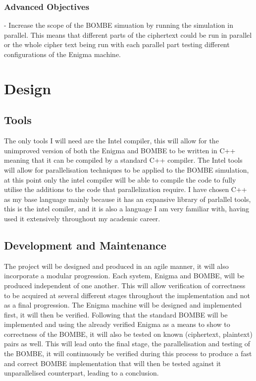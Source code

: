 \documentclass[12pt,a4paper]{article}
\begin{document}
\subsubsection{Advanced Objectives}

- Increase the scope of the BOMBE simuation by running the simulation in parallel. This means that different parts of the ciphertext could be run in parallel or the whole cipher text being run with each parallel part testing different configurations of the Enigma machine.



\section{Design}

\subsection{Tools}

The only tools I will need are the Intel compiler, this will allow for the unimproved version of both the Enigma and BOMBE to be written in C++ meaning that it can be compiled by a standard C++ compiler. The Intel tools will allow for parallelisation techniques to be applied to the BOMBE simulation, at this point only the intel compiler will be able to compile the code to fully utilise the additions to the code that parallelization require. I have chosen C++ as my base language mainly because it has an expansive library of parlallel tools, this is the intel comiler, and it is also a language I am very familiar with, having used it extensively throughout my academic career.

\subsection{Development and Maintenance}

The project will be designed and produced in an agile manner, it will also incorporate a modular progression. Each system, Enigma and BOMBE, will be produced independent of one another. This will allow verification of correctness to be acquired at several different stages throughout the implementation and not as a final progression. The Enigma machine will be designed and implemented first, it will then be verified. Following that the standard BOMBE will be implemented and using the already verified Enigma as a means to show to correctness of the BOMBE, it will also be tested on known (ciphertext, plaintext) pairs as well. This will lead onto the final stage, the parallelisation and testing of the BOMBE, it will continuously be verified during this process to produce a fast and correct BOMBE implementation that will then be tested against it unparallelised counterpart, leading to a conclusion.
\end{document}

